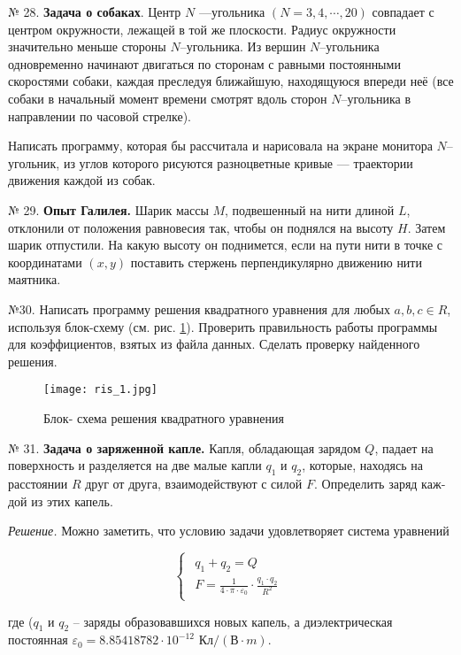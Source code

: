 № 28. {\bf Задача о собаках}.
Центр $N$ ---угольника $(N = 3, 4,\cdots, 20)$ совпадает с центром окружности, лежащей в той же плоскости. Радиус окружности значительно меньше стороны $N$--угольника. Из вершин $N$--угольника одновременно начинают двигаться по сторонам с равными постоянными скоростями собаки, каждая преследуя ближайшую, находящуюся впереди неё (все собаки в начальный момент времени смотрят вдоль сторон $N$--угольника в направлении по часовой стрелке).

Написать программу, которая бы рассчитала и нарисовала на экране монитора $N$--угольник, из углов которого рисуются разноцветные кривые --- траектории движения каждой из собак.

№ 29. {\bf Опыт Галилея.}
Шарик массы $M$, подвешенный на нити длиной $L$, отклонили от положения равновесия так, чтобы он поднялся на высоту $H$. Затем шарик отпустили. На какую высоту он поднимется, если на пути нити в точке с координатами $(x, y)$ поставить стержень перпендикулярно движению нити маятника.

№30. Написать программу решения квадратного уравнения для любых $a,b,c \in R$, используя блок-схему (см. рис. \ref{ris1}). Проверить правильность работы программы для коэффициентов, взятых из файла данных. Сделать проверку найденного решения.

\begin{figure}[!hb]
\centerline{\texttt{[image: ris\_1.jpg]}}
\caption{Блок- схема решения квадратного уравнения}
\label{ris1}
\end{figure}

№ 31. {\bf Задача о заряженной капле.}
Капля, обладающая зарядом $Q$, падает на поверхность и раз­деляется на две малые капли $q_1$ и $q_2$, которые, находясь на расстоянии $R$ друг от друга, взаимодействуют с силой $F$. Определить заряд каж­дой из этих капель.

{\it Решение.} Можно заметить, что условию задачи удовлетворяет система уравнений

\begin{equation}
 \begin{cases}
 \begin{aligned}
   q_1 + q_2 = Q\\
   F = \frac{1}{4\cdot\pi\cdot\varepsilon_0}\cdot\frac{q_1\cdot q_2}{R^2}
   \end{aligned}
 \end{cases}
\end{equation}

где ($q_1$ и $q_2$ -- заряды образовавшихся новых капель, 
а диэлектрическая постоянная
 $\varepsilon_0=8.85418782\cdot 10^{-12}$ $\text{Кл}/(\text{В}\cdot m).$

